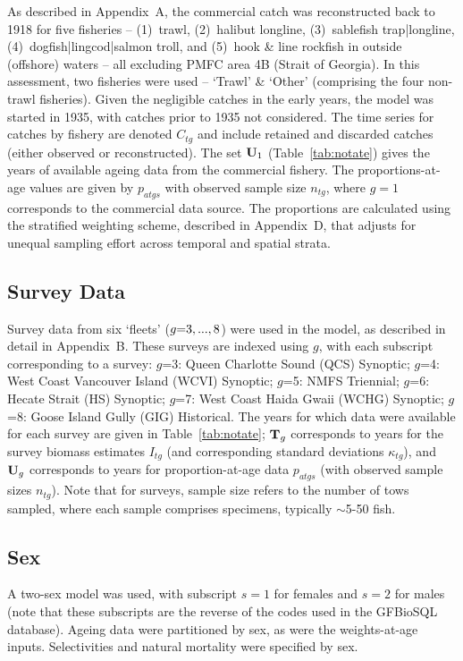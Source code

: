 \documentclass[11pt]{book}
\newcommand{\AppCat}{Appendix~A}
\newcommand{\AppSurv}{Appendix~B}
\newcommand{\AppBio}{Appendix~D}
\begin{document}
As described in \AppCat, the commercial catch was reconstructed back to 1918 for five fisheries -- (1)~trawl, (2)~halibut longline, (3)~sablefish trap|longline, (4)~dogfish|lingcod|salmon troll, and (5)~hook \& line rockfish in outside (offshore) waters -- all excluding PMFC area 4B (Strait of Georgia).
In this assessment, two fisheries were used -- `Trawl' \& `Other' (comprising the four non-trawl fisheries).
Given the negligible catches in the early years, the model was started in 1935, with catches prior to 1935 not considered.
The time series for catches by fishery are denoted $C_{tg}$ and include retained and discarded catches (either observed or reconstructed). 
The set ${\bf U}_{1}$ (Table~\ref{tab:notate}) gives the years of available ageing data from the commercial fishery.
The proportions-at-age values are given by $p_{atgs}$ with observed sample size $n_{tg}$, where $g=1$ corresponds to the commercial data source.
The proportions are calculated using the stratified weighting scheme, described in \AppBio, that adjusts for unequal sampling effort across temporal and spatial strata.

\subsection{Survey Data} 
Survey data from six `fleets' ($g{=}3,...,8$) were used in the model, as described in detail in \AppSurv{}.
These surveys are indexed using $g$, with each subscript corresponding to a survey:  $g$=3: Queen Charlotte Sound (QCS) Synoptic;  $g$=4: West Coast Vancouver Island (WCVI) Synoptic;  $g$=5: NMFS Triennial;  $g$=6: Hecate Strait (HS) Synoptic;  $g$=7: West Coast Haida Gwaii (WCHG) Synoptic;  $g$=8: Goose Island Gully (GIG) Historical.
The years for which data were available for each survey are given in Table~\ref{tab:notate};
${\bf T}_g$ corresponds to years for the survey biomass estimates $I_{tg}$ (and corresponding standard deviations $\kappa_{tg}$), and ${\bf U}_g$ corresponds to years for proportion-at-age data $p_{atgs}$ (with observed sample sizes $n_{tg}$).
Note that for surveys, sample size refers to the number of tows sampled, where each sample comprises specimens, typically $\sim$5-50 fish.

\subsection{Sex}

A two-sex model was used, with subscript $s{=}1$ for females and $s{=}2$ for males (note that these subscripts are the reverse of the codes used in the GFBioSQL database). 
Ageing data were partitioned by sex, as were the weights-at-age inputs. 
Selectivities and natural mortality were specified by sex.
\end{document}
